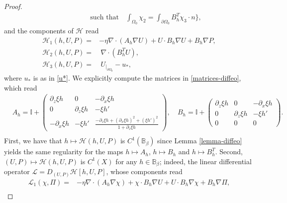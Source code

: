 \documentclass[11pt,a4paper]{amsart}
\theoremstyle{remark}
\theoremstyle{definition}
\numberwithin{equation}{section}
\numberwithin{proposition}{section}
\begin{document}
\begin{proof}
\begin{equation*}
\begin{aligned}
&\qquad \qquad  \text{such that} \quad \int_{\Omega_0} \chi_2 = \int_{\partial \Omega_0}B_h^T \chi_3 \cdot n \bigg\}, \end{aligned}\end{equation*} and the components of $\mathcal{H}$ read
\begin{equation}\label{defH}
	\begin{aligned}
	\mathcal{H}_1(h, U, P)= &-\eta\nabla \cdot (A_h\nabla U) + U \cdot B_h\nabla U + B_h \nabla P,\\[5pt]
	\mathcal{H}_2(h, U, P)= & \ \nabla \cdot (B_h^T U), \\[5pt]
    \mathcal{H}_3(h, U, P)= & \ U_{|_{\partial \Omega_0}} - u_*,
	\end{aligned}
\end{equation}where $u_*$ is as in \eqref{u*}. We explicitly compute the matrices in \eqref{matrices-diffeo}, which read
\begin{equation}\label{exp-matrices}\begin{aligned}
 &A_h= \mathbb{I}  +\left(\begin{matrix}
\partial_z \xi h
  & 0 & -\partial_x \xi h \\[5pt]0&\partial_z \xi h & - \xi h'\\[5pt]
-\partial_x \xi h& - \xi h'&\frac{-\partial_z\xi h + (\partial_x \xi h)^2 + (\xi h')^2}{1+ \partial_z \xi h}
\end{matrix}\right), \
 &B_h= \mathbb{I} +\left(\begin{matrix}
\partial_z \xi h  & 0&-\partial_x \xi h \\[5pt]0 & \partial_z \xi h&  - \xi h'\\[5pt]
0 & 0& 0
\end{matrix}\right).\\[5pt]
\end{aligned}
\end{equation}
First, we have that $h\mapsto\mathcal{H}(h, U, P)$ is $C^1(\mathbb{B}_{\beta})$ since Lemma \ref{lemma-diffeo} yields the same regularity for the maps $h\mapsto A_h$, $h\mapsto B_h$ and $h\mapsto B_h^T$. Second, $(U,P)\mapsto \mathcal{H}(h, U,P)$ is $C^1(X)$ for any $h\in \mathbb{B}_{\beta}$; indeed, the linear differential operator $\mathcal{L}=D_{(U, P)}\mathcal{H}[h,U,P]$, whose components read
\begin{equation*}\begin{aligned}
\mathcal{L}_1( \chi, \Pi)= &-\eta\nabla \cdot (A_h\nabla \chi) + \chi \cdot B_h\nabla U + U \cdot B_h\nabla \chi+ B_h\nabla \Pi,\\[5pt]

\end{aligned}
\end{equation*}
\end{proof}
\end{document}

